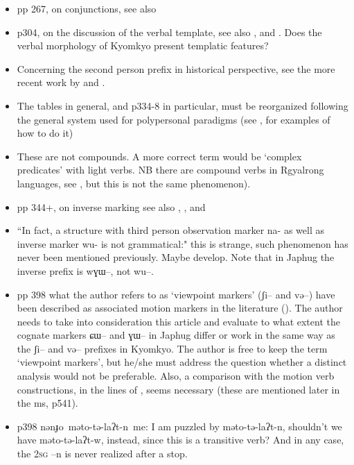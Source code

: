\documentclass[oldfontcommands,oneside,a4paper,11pt]{article}
\newcommand{\ipa}[1]{{\phon \mbox{#1}}} %
\begin{document}
\begin{itemize}
\item pp 267, on conjunctions, see also \citet{jacques14linking}
\item p304, on the discussion of the verbal template, see also \citet[197-199]{jacques13harmonization}, \citet[12]{jacques14antipassive} and \citet{lai13affixale}. Does the verbal morphology of Kyomkyo present templatic features?
\item Concerning the second person prefix in historical perspective, see the more recent work by \citet{jacques12agreement} and \citet{delancey14second}.
\item The tables in general, and p334-8 in particular, must be reorganized following the general system used for polypersonal paradigms (see \citet{gongxun14agreement}, \citet{jacques14inverse} for examples of how to do it)
\item These are not compounds. A more correct term would be `complex predicates' with light verbs. NB there are compound verbs in Rgyalrong languages, see \citet{jacques12incorp}, but this is not the same phenomenon).
\item pp 344+, on inverse marking see also \citet{gongxun14agreement}, \citet{jacques14inverse}, \citet{jacques14rtau} and \citet{lai14person}
\item ``In fact, a structure with third person observation marker na- as well as inverse marker wu- is not
grammatical:" this is strange, such phenomenon has never been mentioned previously. Maybe develop. Note that in Japhug the inverse prefix is \ipa{wɣɯ--}, not \ipa{wu--}.
\item pp 398 what the author refers to as `viewpoint markers' (\ipa{ʃi--} and \ipa{və--}) have been described as associated motion markers in the literature (\citealt{jacques13harmonization}). The author needs to take into consideration this article and evaluate to what extent the cognate markers \ipa{ɕɯ--} and \ipa{ɣɯ--} in Japhug differ or work in the same way as the \ipa{ʃi--} and \ipa{və--} prefixes in Kyomkyo. The author is free to keep the term `viewpoint markers', but he/she must address  the question whether a distinct analysis would not be preferable. Also, a comparison with the motion verb constructions, in the lines of \citet[203]{jacques13harmonization}, seems necessary (these are mentioned later in the ms, p541).
\item p398 \ipa{nənɟo məto-tə-laʔt-n me}: I am puzzled by \ipa{məto-tə-laʔt-n}, shouldn't we have \ipa{məto-tə-laʔt-w}, instead, since this is a transitive verb? And in any case, the \textsc{2sg} \ipa{--n} is never realized after a stop.

\end{itemize}
\end{document}

